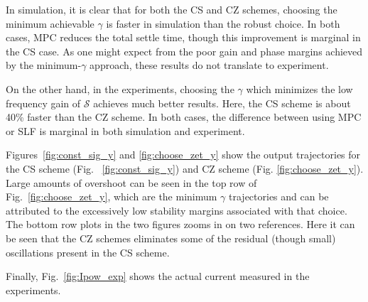 \documentclass[twocolumn,twoside]{IEEEtran}
\begin{document}
In simulation, it is clear that for both the CS and CZ schemes, choosing the minimum achievable $\gamma$ is faster in simulation than the robust choice. In both cases, MPC reduces the total settle time, though this improvement is marginal in the CS case. As one might expect from the poor gain and phase margins achieved by the minimum-$\gamma$ approach, these results do not translate to experiment.

On the other hand, in the experiments, choosing the $\gamma$ which minimizes the low frequency gain of $\mathcal{S}$ achieves much better results. Here, the CS scheme is about 40\% faster than the CZ scheme. In both cases, the difference between using MPC or SLF is marginal in both simulation and experiment.

Figures~\ref{fig:const_sig_y} and \ref{fig:choose_zet_y} show the output trajectories for the CS scheme (Fig. ~\ref{fig:const_sig_y}) and CZ scheme (Fig. \ref{fig:choose_zet_y}). Large amounts of overshoot can be seen in the top row of Fig.~\ref{fig:choose_zet_y}, which are the minimum $\gamma$ trajectories and can be attributed to the excessively low stability margins associated with that choice. The bottom row plots in the two figures zooms in on two references. Here it can be seen that the CZ schemes eliminates some of the residual (though small) oscillations present in the CS scheme.

Finally, Fig.~\ref{fig:Ipow_exp}  shows the actual current measured in the experiments.

\begin{figure*}
  \begin{minipage}{1\columnwidth}
    
  \caption{(top) All the step inputs. (bottom left) best. (bottom right) worst}
  \label{fig:const_sig_y}
\end{minipage}
\hfill
\begin{minipage}{1\columnwidth}
  
  \caption{(top) All the step inputs. (bottom left) best. (bottom right) worst}
  \label{fig:choose_zet_y}
\end{minipage}
\end{figure*}

\begin{figure*}
  
  
  \caption{(left) Simulated and settling-time vs reference size for the 8 different control schemes. (left) Shows the same set of steps for the experimental results. }
  \label{fig:ts_vs_delr}
\end{figure*}
\end{document}
